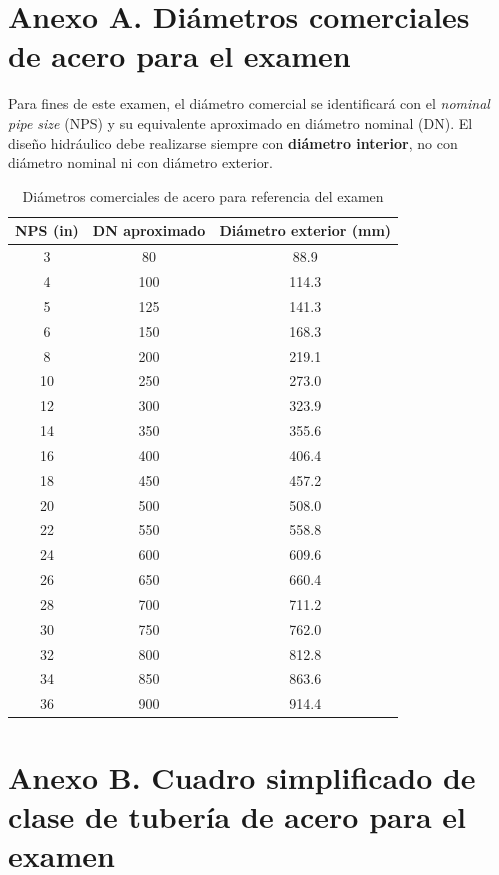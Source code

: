 \clearpage
\section*{Anexo A. Diámetros comerciales de acero para el examen}

\begin{infobox}
Para fines de este examen, el diámetro comercial se identificará con el \emph{nominal pipe size} (NPS) y su equivalente aproximado en diámetro nominal (DN). El diseño hidráulico debe realizarse siempre con \textbf{diámetro interior}, no con diámetro nominal ni con diámetro exterior.
\end{infobox}

\begin{table}[htbp]
\centering
\small
\caption{Diámetros comerciales de acero para referencia del examen}
\label{tab:nps-dn}
\begin{tabular}{ccc}
\toprule
\textbf{NPS (in)} & \textbf{DN aproximado} & \textbf{Diámetro exterior (mm)} \\
\midrule
3 & 80 & 88.9 \\
4 & 100 & 114.3 \\
5 & 125 & 141.3 \\
6 & 150 & 168.3 \\
8 & 200 & 219.1 \\
10 & 250 & 273.0 \\
12 & 300 & 323.9 \\
14 & 350 & 355.6 \\
16 & 400 & 406.4 \\
18 & 450 & 457.2 \\
20 & 500 & 508.0 \\
22 & 550 & 558.8 \\
24 & 600 & 609.6 \\
26 & 650 & 660.4 \\
28 & 700 & 711.2 \\
30 & 750 & 762.0 \\
32 & 800 & 812.8 \\
34 & 850 & 863.6 \\
36 & 900 & 914.4 \\
\bottomrule
\end{tabular}
\end{table}

\clearpage
\section*{Anexo B. Cuadro simplificado de clase de tubería de acero para el examen}


